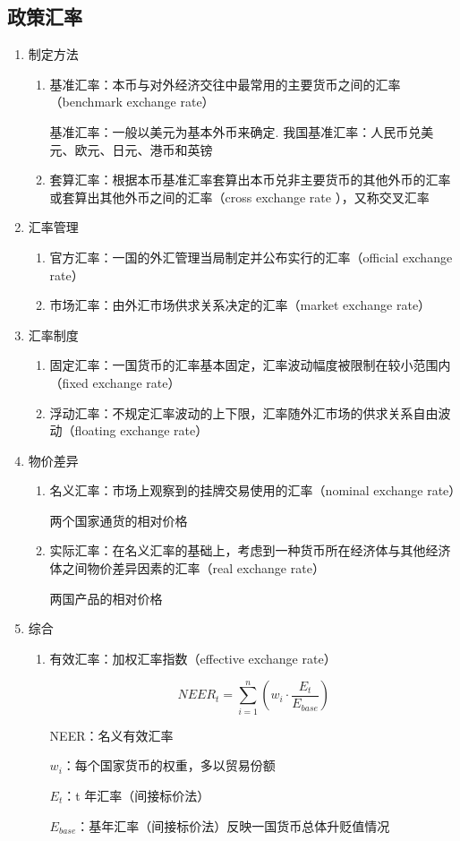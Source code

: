 \documentclass[12pt]{book}
\begin{document}
\subsection{政策汇率}


\begin{enumerate}[1.]
    \item 制定方法	
    \begin{enumerate}[(1)]
        \item 基准汇率：本币与对外经济交往中最常用的主要货币之间的汇率（benchmark exchange rate）  
        \par 基准汇率：一般以美元为基本外币来确定. 我国基准汇率：人民币兑美元、欧元、日元、港币和英镑  
        \item 套算汇率：根据本币基准汇率套算出本币兑非主要货币的其他外币的汇率或套算出其他外币之间的汇率（cross exchange rate ），又称交叉汇率
    \end{enumerate}
    \item 汇率管理
    \begin{enumerate}[(1)]
        \item 官方汇率：一国的外汇管理当局制定并公布实行的汇率（official exchange rate）  
        \item 市场汇率：由外汇市场供求关系决定的汇率（market exchange rate）
    \end{enumerate}	
    \item 汇率制度
    \begin{enumerate}[(1)]
        \item 固定汇率：一国货币的汇率基本固定，汇率波动幅度被限制在较小范围内（fixed exchange rate）  
        \item 浮动汇率：不规定汇率波动的上下限，汇率随外汇市场的供求关系自由波动（floating exchange rate）
    \end{enumerate} 
    \item 物价差异
    \begin{enumerate}[(1)]
        \item 名义汇率：市场上观察到的挂牌交易使用的汇率（nominal exchange rate）  
        \par 两个国家通货的相对价格  
        \item 实际汇率：在名义汇率的基础上，考虑到一种货币所在经济体与其他经济体之间物价差异因素的汇率（real exchange rate）  
        \par 两国产品的相对价格 
    \end{enumerate}
    \item 综合	
    \begin{enumerate}[(1)]
        \item 有效汇率：加权汇率指数（effective exchange rate）  
        \par $$ NEER_t=\sum_{i=1}^{n}\left(w_i\cdot\frac{E_t}{E_{base}}\right) $$  
        \par NEER：名义有效汇率    
        \par $w_i$：每个国家货币的权重，多以贸易份额  
        \par $E_t$：t 年汇率（间接标价法）    
        \par $E_{base}$：基年汇率（间接标价法）反映一国货币总体升贬值情况     
    \end{enumerate}
\end{enumerate}
\end{document}
